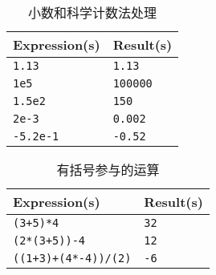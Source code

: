 \documentclass[UTF8]{ctexart}
\begin{document}
\begin{table}[!ht]
    \centering
    \begin{tabular}{|l|l|}
    \hline
        \textbf{Expression(s)} & \textbf{Result(s)} \\ \hline
        \texttt{1.13} & \texttt{1.13} \\ \hline
        \texttt{1e5} & \texttt{100000} \\ \hline
        \texttt{1.5e2} & \texttt{150} \\ \hline
        \texttt{2e-3} & \texttt{0.002} \\ \hline
        \texttt{-5.2e-1} & \texttt{-0.52} \\ \hline
    \end{tabular}
    \caption{小数和科学计数法处理}
\end{table}

\begin{table}[!ht]
    \centering
    \begin{tabular}{|l|l|}
    \hline
        \textbf{Expression(s)} & \textbf{Result(s)} \\ \hline
        \texttt{(3+5)*4} & \texttt{32} \\ \hline
        \texttt{(2*(3+5))-4} & \texttt{12} \\ \hline
        \texttt{((1+3)+(4*-4))/(2)} & \texttt{-6} \\ \hline
    \end{tabular}
    \caption{有括号参与的运算}
\end{table}
\end{document}
